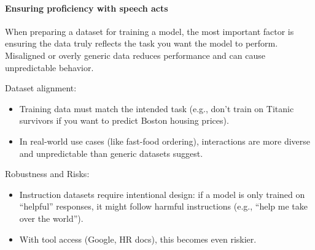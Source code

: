 \paragraph{Ensuring proficiency with speech acts}
When preparing a dataset for training a model, the most important factor is ensuring the data truly reflects the task you want the model to perform. Misaligned or overly generic data reduces performance and can cause unpredictable behavior.

Dataset alignment:
\begin{itemize}
	\item Training data must match the intended task (e.g., don’t train on Titanic survivors if you want to predict Boston housing prices).
	\item In real-world use cases (like fast-food ordering), interactions are more diverse and unpredictable than generic datasets suggest.
\end{itemize}
Robustness and Risks:
\begin{itemize}
	\item Instruction datasets require intentional design: if a model is only trained on “helpful” responses, it might follow harmful instructions (e.g., “help me take over the world”).
	\item With tool access (Google, HR docs), this becomes even riskier.
\end{itemize}

